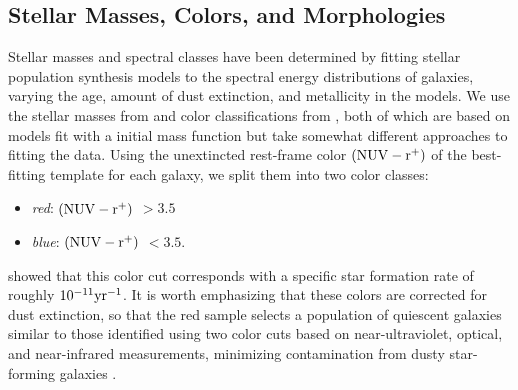 \documentclass[12pt]{emulateapj}
\newcommand{\nuvr}{{$(\rm{NUV} - r^+)$ }}
\begin{document}
\subsection{Stellar Masses, Colors, and Morphologies}
\label{s:otherdata}

Stellar masses and spectral classes have been determined by fitting
stellar population synthesis models to the spectral energy
distributions of galaxies, varying the age, amount of dust extinction,
and metallicity in the models. We use the stellar masses from
\citet{Bundy2010} and color classifications from \citet{Ilbert2010},
both of which are based on \citet{Bruzual2003} models fit with a
\citet{Chabrier2003} initial mass function but take
somewhat different approaches to fitting the data. Using the
unextincted rest-frame color \nuvr of the best-fitting template for
each galaxy, we split them into two color classes:
\begin{itemize}
\item{\textit{red}: \nuvr $>3.5$}
\item{\textit{blue}: \nuvr $<3.5$.}
\end{itemize}
\citet{Ilbert2010} showed that this color cut corresponds with a
specific star formation rate of roughly $10^{-11} \rm{yr^{-1}}$.
It is worth emphasizing that these colors are corrected for dust
extinction, so that the red sample selects a population of quiescent
galaxies similar to those identified using two color cuts based on
near-ultraviolet, optical, and near-infrared measurements, minimizing
contamination from dusty star-forming galaxies
\citep[e.g.,][]{Bundy2010}.
\end{document}
